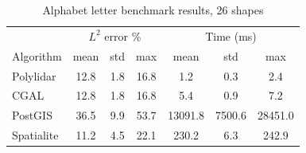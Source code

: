 
 
\begin{table}[!ht]
\centering
\caption{Alphabet letter benchmark results, 26 shapes}
\label{table:ch2_alphabet_tests}
\begin{tabular}{lcccccc}
\toprule
{} & \multicolumn{3}{c}{$L^2$ error \%} & \multicolumn{3}{c}{Time (ms)} \\
{Algorithm} &    mean & std &  max &      mean &     std &     max \\
\midrule
Polylidar  &           12.8 & 1.8 & 16.8 &       1.2 &    0.3 &     2.4 \\
CGAL       &           12.8 & 1.8 & 16.8 &       5.4 &    0.9 &     7.2 \\
PostGIS    &           36.5 & 9.9 & 53.7 &   13091.8 & 7500.6 & 28451.0 \\
Spatialite &           11.2 & 4.5 & 22.1 &     230.2 &    6.3 &   242.9 \\
\bottomrule
\end{tabular}
\end{table}

